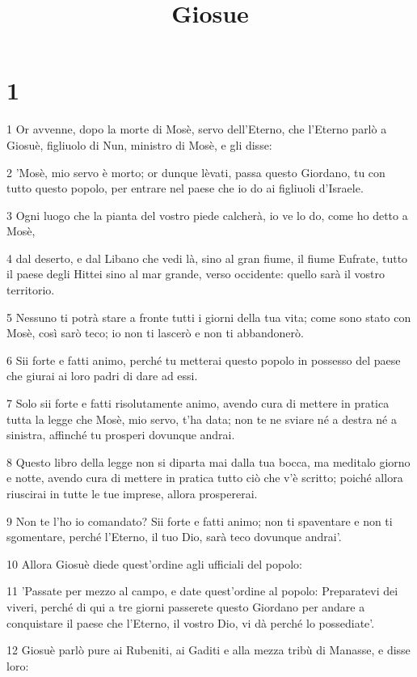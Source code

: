 

\title{Giosue}


\chapter{1}

\par 1 Or avvenne, dopo la morte di Mosè, servo dell'Eterno, che l'Eterno parlò a Giosuè, figliuolo di Nun, ministro di Mosè, e gli disse:
\par 2 'Mosè, mio servo è morto; or dunque lèvati, passa questo Giordano, tu con tutto questo popolo, per entrare nel paese che io do ai figliuoli d'Israele.
\par 3 Ogni luogo che la pianta del vostro piede calcherà, io ve lo do, come ho detto a Mosè,
\par 4 dal deserto, e dal Libano che vedi là, sino al gran fiume, il fiume Eufrate, tutto il paese degli Hittei sino al mar grande, verso occidente: quello sarà il vostro territorio.
\par 5 Nessuno ti potrà stare a fronte tutti i giorni della tua vita; come sono stato con Mosè, così sarò teco; io non ti lascerò e non ti abbandonerò.
\par 6 Sii forte e fatti animo, perché tu metterai questo popolo in possesso del paese che giurai ai loro padri di dare ad essi.
\par 7 Solo sii forte e fatti risolutamente animo, avendo cura di mettere in pratica tutta la legge che Mosè, mio servo, t'ha data; non te ne sviare né a destra né a sinistra, affinché tu prosperi dovunque andrai.
\par 8 Questo libro della legge non si diparta mai dalla tua bocca, ma meditalo giorno e notte, avendo cura di mettere in pratica tutto ciò che v'è scritto; poiché allora riuscirai in tutte le tue imprese, allora prospererai.
\par 9 Non te l'ho io comandato? Sii forte e fatti animo; non ti spaventare e non ti sgomentare, perché l'Eterno, il tuo Dio, sarà teco dovunque andrai'.
\par 10 Allora Giosuè diede quest'ordine agli ufficiali del popolo:
\par 11 'Passate per mezzo al campo, e date quest'ordine al popolo: Preparatevi dei viveri, perché di qui a tre giorni passerete questo Giordano per andare a conquistare il paese che l'Eterno, il vostro Dio, vi dà perché lo possediate'.
\par 12 Giosuè parlò pure ai Rubeniti, ai Gaditi e alla mezza tribù di Manasse, e disse loro:
